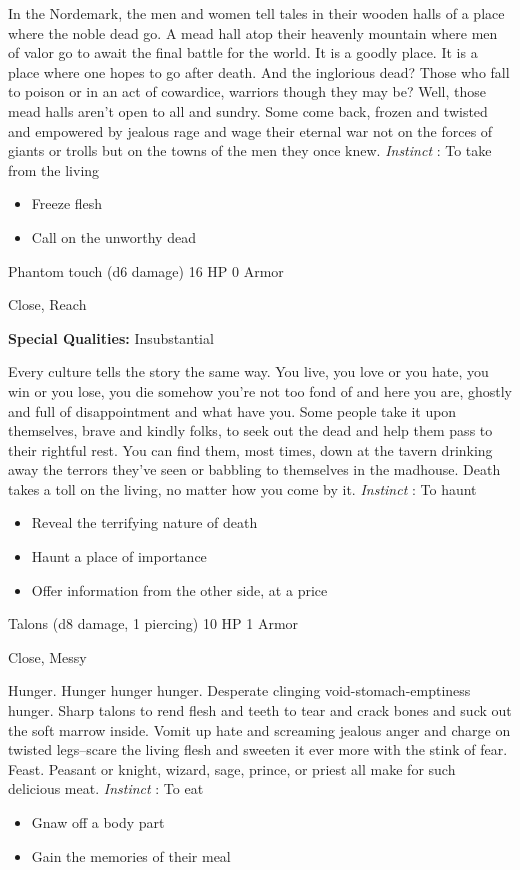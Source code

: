  In the Nordemark, the men and women tell tales in their wooden halls of a place where the noble dead go. A mead hall atop their heavenly mountain where men of valor go to await the final battle for the world. It is a goodly place. It is a place where one hopes to go after death. And the inglorious dead? Those who fall to poison or in an act of cowardice, warriors though they may be? Well, those mead halls aren't open to all and sundry. Some come back, frozen and twisted and empowered by jealous rage and wage their eternal war not on the forces of giants or trolls but on the towns of the men they once knew. \emph{Instinct}
: To take from the living
\begin{itemize}
\item Freeze flesh
\item Call on the unworthy dead

\end{itemize}




 Phantom touch (d6 damage) 16 HP 0 Armor


 Close, Reach


 \textbf{Special Qualities:}
 Insubstantial


 Every culture tells the story the same way. You live, you love or you hate, you win or you lose, you die somehow you're not too fond of and here you are, ghostly and full of disappointment and what have you. Some people take it upon themselves, brave and kindly folks, to seek out the dead and help them pass to their rightful rest. You can find them, most times, down at the tavern drinking away the terrors they've seen or babbling to themselves in the madhouse. Death takes a toll on the living, no matter how you come by it. \emph{Instinct}
: To haunt
\begin{itemize}
\item Reveal the terrifying nature of death
\item Haunt a place of importance 
\item Offer information from the other side, at a price

\end{itemize}




 Talons (d8 damage, 1 piercing) 10 HP 1 Armor


 Close, Messy


 Hunger. Hunger hunger hunger. Desperate clinging void-stomach-emptiness hunger. Sharp talons to rend flesh and teeth to tear and crack bones and suck out the soft marrow inside. Vomit up hate and screaming jealous anger and charge on twisted legs--scare the living flesh and sweeten it ever more with the stink of fear. Feast. Peasant or knight, wizard, sage, prince, or priest all make for such delicious meat. \emph{Instinct}
: To eat
\begin{itemize}
\item Gnaw off a body part
\item Gain the memories of their meal

\end{itemize}


